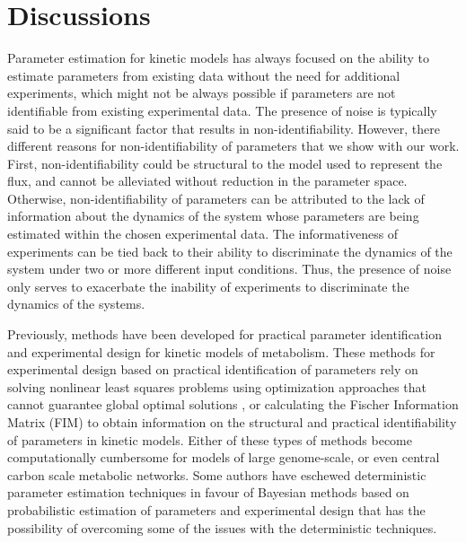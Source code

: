 \documentclass[10pt]{article}
\begin{document}
	
	\section{Discussions}\label{sec:discussion}	
	Parameter estimation for kinetic models has always focused on the ability to estimate parameters from existing data without the need for additional experiments, which might not be always possible if parameters are not identifiable from existing experimental data. The presence of noise is typically said to be a significant factor that results in non-identifiability. However, there different reasons for non-identifiability of parameters that we show with our work. First, non-identifiability could be structural to the model used to represent the flux, and cannot be alleviated without reduction in the parameter space. Otherwise, non-identifiability of parameters can be attributed to the lack of information about the dynamics of the system whose parameters are being estimated within the chosen experimental data. The informativeness of experiments can be tied back to their ability to discriminate the dynamics of the system under two or more different input conditions. Thus, the presence of noise only serves to exacerbate the inability of experiments to discriminate the dynamics of the systems. 
	
	Previously, methods have been developed for practical parameter identification and experimental design for kinetic models of metabolism. These methods for experimental design based on practical identification of parameters rely on solving nonlinear least squares problems using optimization approaches that cannot guarantee global optimal solutions \parencite{Raue2009a}, or calculating the Fischer Information Matrix (FIM) to obtain information on the structural and practical identifiability of parameters in kinetic models. Either of these types of methods become computationally cumbersome for models of large genome-scale, or even central carbon scale metabolic networks. Some authors have eschewed deterministic parameter estimation techniques in favour of Bayesian methods based on probabilistic estimation of parameters and experimental design \parencite{Saa2016, Saa2016a} that has the possibility of overcoming some of the issues with the deterministic techniques. 	
	 
\end{document}
